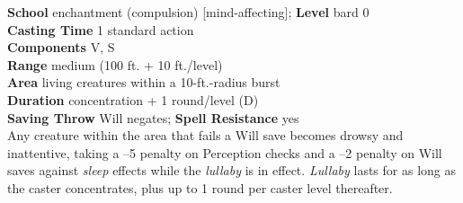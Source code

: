 \textbf{School} enchantment (compulsion) [mind-affecting]; \textbf{Level} bard 0\\
\textbf{Casting Time} 1 standard action\\
\textbf{Components} V, S\\
\textbf{Range }medium (100 ft. + 10 ft./level)\\
\textbf{Area} living creatures within a 10-ft.-radius burst\\
\textbf{Duration} concentration + 1 round/level (D)\\
\textbf{Saving Throw }Will negates; \textbf{Spell Resistance} yes\\
Any creature within the area that fails a Will save becomes drowsy and inattentive, taking a –5 penalty on Perception checks and a –2 penalty on Will saves against \textit{sleep }effects while the \textit{lullaby }is in effect. \textit{Lullaby }lasts for as long as the caster concentrates, plus up to 1 round per caster level thereafter.\\
